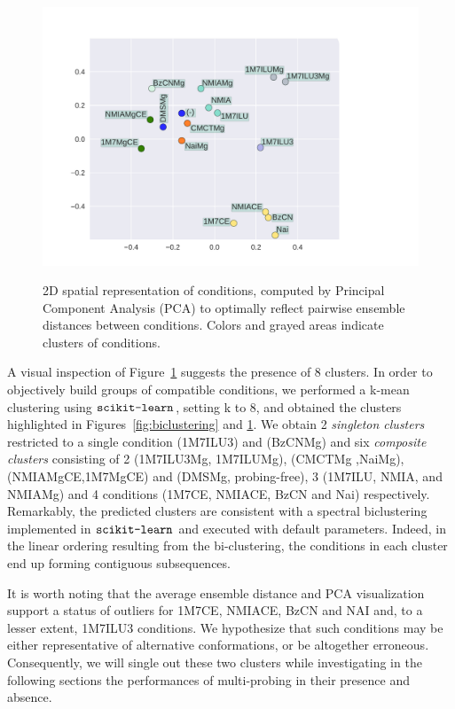 \documentclass[a4,center,fleqn]{NAR}
\newcommand{\Software}[1]{$\text{\ttfamily #1}$}
\newcommand{\Def}[1]{{\em #1}}
\begin{document}
\begin{figure}
	{\centering \includegraphics[width=1.2\linewidth]{graphs/didy/PCA}\\}%
	
	\caption{2D spatial representation of conditions, computed by Principal Component Analysis (PCA) to optimally reflect pairwise ensemble distances between conditions. Colors and grayed areas indicate clusters of conditions.}\label{fig:PCA}
\end{figure}

A visual inspection of Figure~\ref{fig:PCA} suggests the presence of 8 clusters. In order to objectively build groups of compatible conditions, we performed a k-mean clustering using \Software{scikit-learn}, setting k to 8, and obtained the clusters highlighted in Figures~\ref{fig:biclustering} and \ref{fig:PCA}.  We obtain 2 \Def{singleton clusters} restricted to a single condition (1M7ILU3) and (BzCNMg) and six \Def{composite clusters} consisting of 2 (1M7ILU3Mg, 1M7ILUMg), (CMCTMg ,NaiMg), (NMIAMgCE,1M7MgCE) and (DMSMg, probing-free), 3 (1M7ILU, NMIA, and NMIAMg) and 4 conditions (1M7CE, NMIACE, BzCN and Nai) respectively.  Remarkably, the predicted clusters are consistent with a spectral biclustering implemented in \Software{scikit-learn} and executed with default parameters. Indeed, in the linear ordering resulting from the bi-clustering, the conditions in each cluster end up forming contiguous subsequences.

It is worth noting that the average ensemble distance and PCA visualization support a status of outliers for 1M7CE, NMIACE, BzCN and NAI and, to a lesser extent, 1M7ILU3 conditions.  We hypothesize that such conditions may be either representative of alternative conformations, or be altogether erroneous. Consequently, we will single out these two clusters while investigating in the following sections the performances of multi-probing in their presence and absence.
\end{document}
